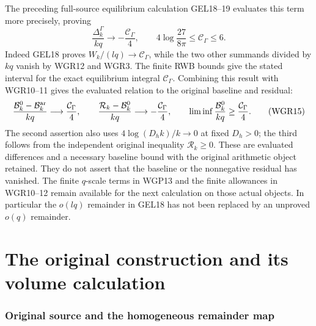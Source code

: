 \documentclass[11pt,a4paper]{article}
\begin{document}
The preceding full-source equilibrium calculation GEL18--19 evaluates
this term more precisely, proving
\[
 \boxed{\frac{\Delta_k^\Gamma}{kq}\longrightarrow
       -\frac{\mathcal C_\Gamma}{4},\qquad
 4\log\frac{27}{8\pi}\le\mathcal C_\Gamma\le6.}
 \tag{WGR14}
\]
Indeed GEL18 proves $W_k/(lq)\to\mathcal C_\Gamma$, while the
two other summands divided by $kq$ vanish by WGR12 and WGR3.
The finite RWB bounds give the stated interval for the exact equilibrium
integral $\mathcal C_\Gamma$. Combining this result with WGR10--11
gives the evaluated relation to the original baseline and residual:
\[
 \frac{\mathcal B_k^0-\mathcal B_k^{\rm ar}}{kq}
       \longrightarrow\frac{\mathcal C_\Gamma}{4},\qquad
 \frac{\mathcal R_k-\mathcal B_k^0}{kq}
       \longrightarrow-\frac{\mathcal C_\Gamma}{4},\qquad
 \liminf\frac{\mathcal B_k^0}{kq}\ge\frac{\mathcal C_\Gamma}{4}.
 \tag{WGR15}
\]
The second assertion also uses $4\log(D_hk)/k\to0$ at fixed $D_h>0$;
the third follows from the independent original inequality
$\mathcal R_k\ge0$. These are evaluated differences and a necessary
baseline bound with the original arithmetic object retained. They do
not assert that the baseline or the nonnegative residual has vanished.
The finite $q$-scale terms in WGP13 and the finite allowances in
WGR10--12 remain available for the next calculation on those actual
objects. In particular the $o(lq)$ remainder in GEL18 has not been
replaced by an unproved $o(q)$ remainder.


\clearpage
\part{The original construction and its volume calculation}




\section{Original source and the homogeneous remainder map}
\end{document}
